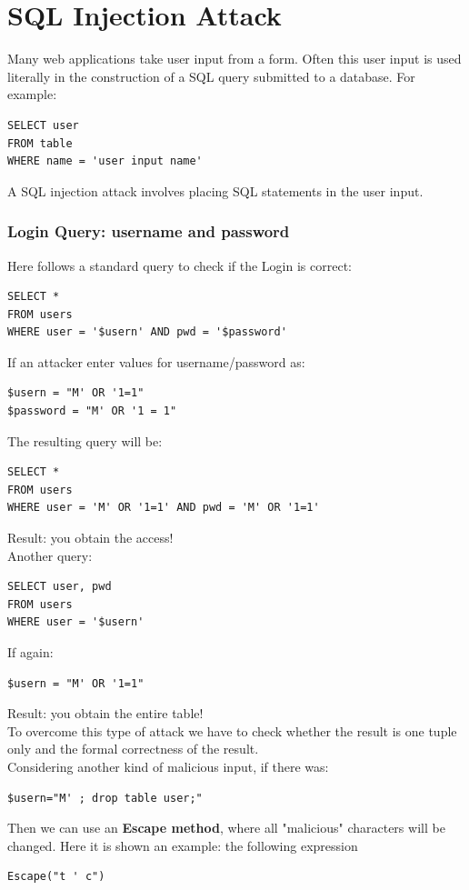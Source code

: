 \section{SQL Injection Attack}
Many web applications take user input from a form. Often this user input is used literally in the construction of a SQL query submitted to a database. For example:
\begin{lstlisting}
SELECT user 
FROM table
WHERE name = 'user input name'
\end{lstlisting}
A SQL injection attack involves placing SQL statements in the user input.
\subsubsection{Login Query: username and password} 
Here follows a standard query to check if the Login is correct:
\begin{lstlisting}
SELECT * 
FROM users 
WHERE user = '$usern' AND pwd = '$password'
\end{lstlisting}
If an attacker enter values for username/password as:
\begin{lstlisting}
$usern = "M' OR '1=1"
$password = "M' OR '1 = 1"
\end{lstlisting}
The resulting query will be:
\begin{lstlisting}
SELECT * 
FROM users 
WHERE user = 'M' OR '1=1' AND pwd = 'M' OR '1=1'
\end{lstlisting}
Result: you obtain the access!\\
Another query:
\begin{lstlisting}
SELECT user, pwd 
FROM users 
WHERE user = '$usern' 
\end{lstlisting}
If again:
\begin{lstlisting}
$usern = "M' OR '1=1" 
\end{lstlisting}
Result: you obtain the entire table!\\
To overcome this type of attack we have to check whether the result is one tuple only and the formal correctness of the result. \\
\linebreak
Considering another kind of malicious input, if there was:  
\begin{lstlisting} 
$usern="M' ; drop table user;"
\end{lstlisting}
Then we can use an \textbf{Escape method}, where all "malicious" characters will be changed.
Here it is shown an example: the following expression
\begin{lstlisting} 
Escape("t ' c") 
\end{lstlisting}
